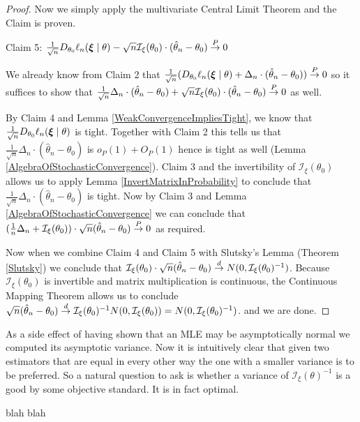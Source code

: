 \begin{proof}
Now we simply apply the multivariate Central Limit Theorem and the
Claim is proven.

Claim 5: $ \frac{1}{\sqrt{n}} D_{\theta_0} \ell_n(\boldsymbol{\xi}
\mid \theta) -  \sqrt{n} \mathcal{I}_\xi(\theta_0) \cdot
(\hat{\theta}_n - \theta_0) \overset{P}\to 0$

We already know from Claim 2 that $ \frac{1}{\sqrt{n}} (D_{\theta_0} \ell_n(\boldsymbol{\xi}
\mid \theta) + \Delta_n \cdot
(\hat{\theta}_n - \theta_0)) \overset{P}\to 0$ so it suffices to show that $\frac{1}{\sqrt{n}}\Delta_n \cdot
(\hat{\theta}_n - \theta_0) +  \sqrt{n} \mathcal{I}_\xi(\theta_0) \cdot
(\hat{\theta}_n - \theta_0) \overset{P}\to 0$
as well.  

By Claim 4 and Lemma \ref{WeakConvergenceImpliesTight}, we know that 
$ \frac{1}{\sqrt{n}} D_{\theta_0} \ell_n(\boldsymbol{\xi} \mid \theta)$ is
tight.  Together with Claim 2 this tells us that $\frac{1}{\sqrt{n}}\Delta_n \cdot (\hat{\theta}_n -
\theta_0)$ is $o_P(1) + O_P(1)$ hence is tight as well (Lemma
\ref{AlgebraOfStochasticConvergence}).  
Claim 3 and the invertibility of $\mathcal{I}_\xi(\theta_0)$ allows us
to apply  Lemma \ref{InvertMatrixInProbability} to conclude that $\frac{1}{\sqrt{n}}\Delta_n \cdot (\hat{\theta}_n -
\theta_0)$ is tight.
Now by Claim 3 and Lemma
\ref{AlgebraOfStochasticConvergence} we
can conclude that $ (\frac{1}{n}\Delta_n + \mathcal{I}_\xi(\theta_0))
\cdot \sqrt{n} (\hat{\theta}_n - \theta_0) \overset{P}\to 0$ as required.


Now when we combine Claim 4 and Claim 5 with Slutsky's Lemma (Theorem
\ref{Slutsky}) we conclude that $\mathcal{I}_\xi(\theta_0)
\cdot \sqrt{n} (\hat{\theta}_n - \theta_0) \overset{d}\to N(0,
\mathcal{I}_\xi(\theta_0)^{-1})$.  Because $\mathcal{I}_\xi(\theta_0)$ is invertible and matrix multiplication is
continuous, the Continuous Mapping Theorem allows us to conclude 
$\sqrt{n} 
(\hat{\theta}_n - \theta_0) \overset{d}\to \mathcal{I}_\xi(\theta_0)^{-1}
N(0, \mathcal{I}_\xi(\theta_0)) = N(0, \mathcal{I}_\xi(\theta_0)^{-1})$.
and we are done.
\end{proof}

As a side effect of having shown that an MLE may be asymptotically
normal we computed its asymptotic variance.  Now it is intuitively
clear that given two estimators that are equal in every other way the
one with a smaller variance is to be preferred.  So a natural question
to ask is whether a variance of $\mathcal{I}_\xi(\theta)^{-1}$ is a good by some objective
standard.  It is in fact optimal.

\begin{thm}\label{CRLB}blah blah
\end{thm}

